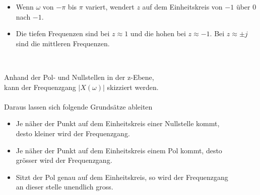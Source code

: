 		\begin{itemize}
			 \item Wenn $\omega$ von $-\pi$ bis $\pi$ variert, wendert $z$ auf dem Einheitskreis von $-1$ über $0$ nach $-1$.
			 \item Die tiefen Frequenzen sind bei $z \approx 1 $ und die hohen bei $z \approx -1 $. Bei $z \approx \pm j$ sind die mittleren Frequenzen.
		\end{itemize}$ $\\[-0.1cm]
		\begin{minipage}{0.7\textwidth}
			Anhand der Pol- und Nullstellen in der z-Ebene,\\ kann der Frequenzgang $|X(\omega)|$ skizziert werden.\\[0.3cm]
			\\[0.3cm]
			Daraus lassen sich folgende Grundsätze ableiten\\[-0.3cm]
			\begin{itemize}
				\item Je näher der Punkt auf dem Einheitskreis einer Nullstelle kommt,\\ desto kleiner wird der Frequenzgang.\\[-0.25cm]
				\item Je näher der Punkt auf dem Einheitskreis einem Pol kommt, desto\\ grösser wird der Frequenzgang.\\[-0.25cm]
				\item Sitzt der Pol genau auf dem Einheitskreis, so wird der Frequenzgang\\ an dieser stelle unendlich gross.
			\end{itemize}
		\end{minipage}
